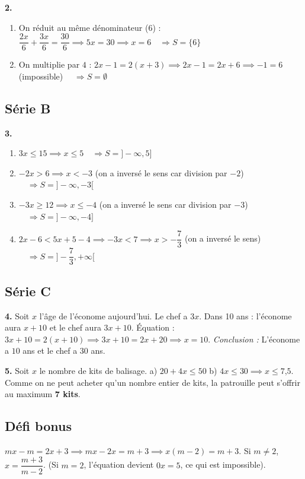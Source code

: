 \documentclass[../main.tex]{subfiles}
\begin{document}
\textbf{2.}
\begin{enumerate}[label=\alph*)]
  \item On réduit au même dénominateur ($6$) : $\dfrac{2x}{6} + \dfrac{3x}{6} = \dfrac{30}{6} \implies 5x = 30 \implies x = 6 \quad \Rightarrow S = \{6\}$
  \item On multiplie par $4$ : $2x - 1 = 2(x + 3) \implies 2x - 1 = 2x + 6 \implies -1 = 6$ (impossible) $\quad \Rightarrow S = \emptyset$
\end{enumerate}

\subsection*{Série B}

\textbf{3.}
\begin{enumerate}[label=\alph*)]
  \item $3x \le 15 \implies x \le 5 \quad \Rightarrow S = ]-\infty, 5]$
  \item $-2x > 6 \implies x < -3$ (on a inversé le sens car division par $-2$) $\quad \Rightarrow S = ]-\infty, -3[$
  \item $-3x \ge 12 \implies x \le -4$ (on a inversé le sens car division par $-3$) $\quad \Rightarrow S = ]-\infty, -4]$
  \item $2x - 6 < 5x + 5 - 4 \implies -3x < 7 \implies x > -\dfrac{7}{3}$ (on a inversé le sens) $\quad \Rightarrow S = ]-\dfrac{7}{3}, +\infty[$
\end{enumerate}

\subsection*{Série C}

\textbf{4.} Soit $x$ l'âge de l'économe aujourd'hui. Le chef a $3x$. 
Dans 10 ans : l'économe aura $x + 10$ et le chef aura $3x + 10$.
Équation : $3x + 10 = 2(x + 10) \implies 3x + 10 = 2x + 20 \implies x = 10$.
\textit{Conclusion :} L'économe a $10$ ans et le chef a $30$ ans.

\textbf{5.} Soit $x$ le nombre de kits de balisage.
a) $20 + 4x \le 50$ \quad 
b) $4x \le 30 \implies x \le 7\text{,}5$. 
Comme on ne peut acheter qu'un nombre entier de kits, la patrouille peut s'offrir au maximum \textbf{7 kits}.

\subsection*{Défi bonus}

$mx - m = 2x + 3 \implies mx - 2x = m + 3 \implies x(m - 2) = m + 3$.
Si $m \neq 2$, $x = \dfrac{m + 3}{m - 2}$. (Si $m = 2$, l'équation devient $0x = 5$, ce qui est impossible).
\end{document}
